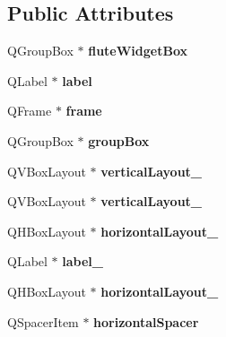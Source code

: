 \subsection*{Public Attributes}
\begin{DoxyCompactItemize}
\item 
\mbox{\label{classUi__Widget_a92f7bf3df134ee717e894c19d9319b58}} 
Q\+Group\+Box $\ast$ {\bfseries flute\+Widget\+Box}
\item 
\mbox{\label{classUi__Widget_a3126b93450dcc18cede73b9d1ee7c6b0}} 
Q\+Label $\ast$ {\bfseries label}
\item 
\mbox{\label{classUi__Widget_a073422b2dfb77c2e63a23152b1c3be5d}} 
Q\+Frame $\ast$ {\bfseries frame}
\item 
\mbox{\label{classUi__Widget_aea37e9db03684846119025608dc10a57}} 
Q\+Group\+Box $\ast$ {\bfseries group\+Box}
\item 
\mbox{\label{classUi__Widget_a004e166e87cf3bad437fdbb4443c37c8}} 
Q\+V\+Box\+Layout $\ast$ {\bfseries vertical\+Layout\+\_}
\item 
\mbox{\label{classUi__Widget_aacb08d12203102e108d60ab2af782b41}} 
Q\+V\+Box\+Layout $\ast$ {\bfseries vertical\+Layout\+\_}
\item 
\mbox{\label{classUi__Widget_a0c34d30205583fe92e037700d06e78e0}} 
Q\+H\+Box\+Layout $\ast$ {\bfseries horizontal\+Layout\+\_}
\item 
\mbox{\label{classUi__Widget_adfcab5569ac08da197e14dba01390755}} 
Q\+Label $\ast$ {\bfseries label\+\_}
\item 
\mbox{\label{classUi__Widget_afe8e31232d15d702c652c82cf73a9344}} 
Q\+H\+Box\+Layout $\ast$ {\bfseries horizontal\+Layout\+\_}
\item 
\mbox{\label{classUi__Widget_abb499f011a08eec7ba87613a475b9b05}} 
Q\+Spacer\+Item $\ast$ {\bfseries horizontal\+Spacer}
\item 
\mbox{\label{classUi__Widget_a060f981c344526f7f30115fd3ec6737b}} 

\end{DoxyCompactItemize}
